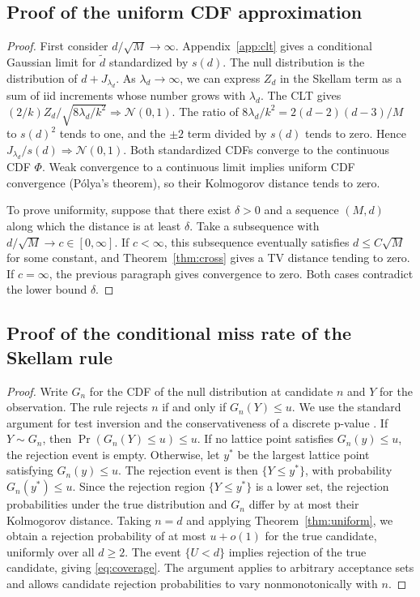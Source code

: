 \subsection{Proof of the uniform CDF approximation}
\begin{proof}
First consider $d/\sqrt M\to\infty$. Appendix~\ref{app:clt} gives a conditional Gaussian limit for $\widetilde d$ standardized by $s(d)$. The null distribution is the distribution of $d+J_{\lambda_d}$. As $\lambda_d\to\infty$, we can express $Z_d$ in the Skellam term as a sum of iid increments whose number grows with $\lambda_d$. The CLT gives $(2/k)Z_d/\sqrt{8\lambda_d/k^2}\Rightarrow\mathcal N(0,1)$. The ratio of $8\lambda_d/k^2=2(d-2)(d-3)/M$ to $s(d)^2$ tends to one, and the $\pm2$ term divided by $s(d)$ tends to zero. Hence $J_{\lambda_d}/s(d)\Rightarrow\mathcal N(0,1)$. Both standardized CDFs converge to the continuous CDF $\Phi$. Weak convergence to a continuous limit implies uniform CDF convergence (P\'olya's theorem), so their Kolmogorov distance tends to zero.

To prove uniformity, suppose that there exist $\delta>0$ and a sequence $(M,d)$ along which the distance is at least $\delta$. Take a subsequence with $d/\sqrt M\to c\in[0,\infty]$. If $c<\infty$, this subsequence eventually satisfies $d\le C\sqrt M$ for some constant, and Theorem~\ref{thm:cross} gives a TV distance tending to zero. If $c=\infty$, the previous paragraph gives convergence to zero. Both cases contradict the lower bound $\delta$.
\end{proof}

\subsection{Proof of the conditional miss rate of the Skellam rule}
\begin{proof}
Write $G_n$ for the CDF of the null distribution at candidate $n$ and $Y$ for the observation. The rule rejects $n$ if and only if $G_n(Y)\le u$. We use the standard argument for test inversion and the conservativeness of a discrete p-value \cite{neyman1937}. If $Y\sim G_n$, then $\Pr(G_n(Y)\le u)\le u$. If no lattice point satisfies $G_n(y)\le u$, the rejection event is empty. Otherwise, let $y^*$ be the largest lattice point satisfying $G_n(y)\le u$. The rejection event is then $\{Y\le y^*\}$, with probability $G_n(y^*)\le u$. Since the rejection region $\{Y\le y^*\}$ is a lower set, the rejection probabilities under the true distribution and $G_n$ differ by at most their Kolmogorov distance. Taking $n=d$ and applying Theorem~\ref{thm:uniform}, we obtain a rejection probability of at most $u+o(1)$ for the true candidate, uniformly over all $d\ge2$. The event $\{U<d\}$ implies rejection of the true candidate, giving \eqref{eq:coverage}. The argument applies to arbitrary acceptance sets and allows candidate rejection probabilities to vary nonmonotonically with $n$.
\end{proof}


